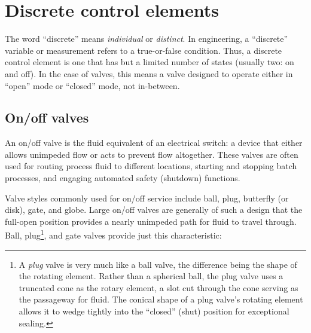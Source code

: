 
\chapter{Discrete control elements}

The word ``discrete'' means \textit{individual} or \textit{distinct}.  In engineering, a ``discrete'' variable or measurement refers to a true-or-false condition.  Thus, a discrete control element is one that has but a limited number of states (usually two: on and off).  In the case of valves, this means a valve designed to operate either in ``open'' mode or ``closed'' mode, not in-between.  





\filbreak
\section{On/off valves}

An on/off valve is the fluid equivalent of an electrical switch: a device that either allows unimpeded flow or acts to prevent flow altogether.  These valves are often used for routing process fluid to different locations, starting and stopping batch processes, and engaging automated safety (shutdown) functions.

Valve styles commonly used for on/off service include ball, plug, butterfly (or disk), gate, and globe.  Large on/off valves are generally of such a design that the full-open position provides a nearly unimpeded path for fluid to travel through.  Ball, plug\footnote{A \textit{plug} valve is very much like a ball valve, the difference being the shape of the rotating element.  Rather than a spherical ball, the plug valve uses a truncated cone as the rotary element, a slot cut through the cone serving as the passageway for fluid.  The conical shape of a plug valve's rotating element allows it to wedge tightly into the ``closed'' (shut) position for exceptional sealing.}, and gate valves provide just this characteristic:

